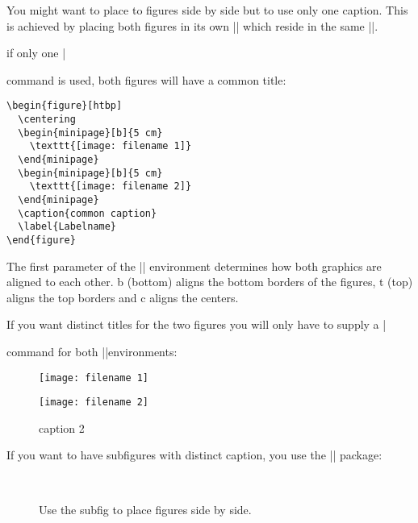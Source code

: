 You might want to place to figures side by side but to use only one caption. This is achieved by placing both figures in its own |\minipage| which reside in the same |\figure|.

if only one |\caption| command is used, both figures will have a common title:

\medskip
\begin{Verbatim}
\begin{figure}[htbp]
  \centering
  \begin{minipage}[b]{5 cm}
    \texttt{[image: filename 1]}  
  \end{minipage}
  \begin{minipage}[b]{5 cm}
    \texttt{[image: filename 2]}  
  \end{minipage}
  \caption{common caption}
  \label{Labelname}
\end{figure}
\end{Verbatim}
\medskip

The first parameter of the |\minipage| environment determines how both graphics are aligned to each other. b (bottom) aligns the bottom borders of the figures, t (top) aligns the top borders and c aligns the centers.

If you want distinct titles for the two figures you will only have to supply a |\caption| command for both |\minipage|environments:

\begin{teX}
\begin{figure}[htbp]
  \centering
  \begin{minipage}[b]{5 cm}
    \texttt{[image: filename 1]} 
    \caption{caption 1}
    \label{labelname 1}
  \end{minipage}
  \begin{minipage}[b]{5 cm}
    \texttt{[image: filename 2]}  
    \caption{caption 2}
    \label{labelname 2}
  \end{minipage}
\end{figure}
\end{teX}


If you want to have subfigures with distinct caption, you use the |\subfig| package:

\begin{fullwidth}
\begin{figure}%
    \captionsetup[figure]{margin=3pt}%
    \hfill
     \\[-10pt]
    \caption{First figure --- but this one has a very very long caption.
     So long that it continues over into a second line so that we can 
     test the margin setting and centering of the caption command in the
     full page mode.}%
    \label{fig:Afirst}%
    \caption{Use the subfig to place figures side by side.}%
    \label{fig:Athird}%
\end{figure}
\end{fullwidth}

